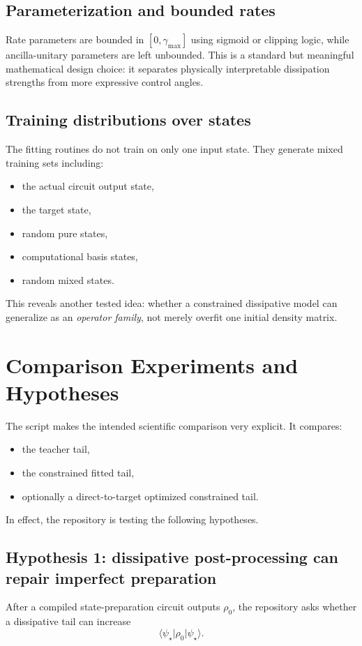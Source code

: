 \documentclass[11pt,a4paper]{article}
\begin{document}
\subsection{Parameterization and bounded rates}
Rate parameters are bounded in $[0,\gamma_{\max}]$ using sigmoid or clipping logic, while ancilla-unitary parameters are left unbounded. This is a standard but meaningful mathematical design choice: it separates physically interpretable dissipation strengths from more expressive control angles.

\subsection{Training distributions over states}
The fitting routines do not train on only one input state. They generate mixed training sets including:
\begin{itemize}
  \item the actual circuit output state,
  \item the target state,
  \item random pure states,
  \item computational basis states,
  \item random mixed states.
\end{itemize}
This reveals another tested idea: whether a constrained dissipative model can generalize as an \emph{operator family}, not merely overfit one initial density matrix.

\section{Comparison Experiments and Hypotheses}
The script  makes the intended scientific comparison very explicit. It compares:
\begin{itemize}
  \item the teacher tail,
  \item the constrained fitted tail,
  \item optionally a direct-to-target optimized constrained tail.
\end{itemize}

In effect, the repository is testing the following hypotheses.

\subsection*{Hypothesis 1: dissipative post-processing can repair imperfect preparation}
After a compiled state-preparation circuit outputs $\rho_0$, the repository asks whether a dissipative tail can increase
\[
\langle \psi_\star \rvert \rho_0 \lvert \psi_\star \rangle.
\]
\end{document}

